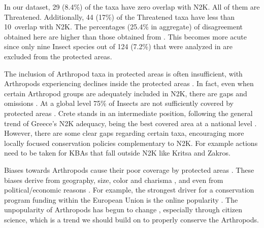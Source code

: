 In our dataset, 29 (8.4\%) of the taxa have zero overlap with N2K. All of them
are Threatened. Additionally, 44 (17\%) of the Threatened taxa have less than
10\ overlap with N2K. The percentages (25.4\% in aggregate) of disagreement
obtained here are higher than those obtained from \textcite{spiliopoulou2021the-natura}.
This becomes more acute since only nine Insect species out of 124 (7.2\%) that
were analyzed in \textcite{spiliopoulou2021the-natura} are excluded from the protected areas.

The inclusion of Arthropod taxa in protected areas is often insufficient, with
Arthropods experiencing declines inside the protected areas \parencite{borges2005ranking,chowdhury2023protected,harry2019protected,rada2019protected}.
In fact, even when certain Arthropod groups are adequately included in N2K,
there are gaps and omissions \parencite{sanchez-fernandez2008are-the-endemic,verovnik2011is-the-natura}.
At a global level 75\% of Insects are not sufficiently covered by protected
areas \parencite{chowdhury2023three-quarters}. Crete stands in an intermediate position,
following the general trend of Greece’s N2K adequacy, being the best covered
area at a national level \parencite{kougioumoutzis2021plant,spiliopoulou2021the-natura}.
However, there are some clear gaps regarding certain taxa, encouraging more
locally focused conservation policies complementary to N2K. For example actions
need to be taken for KBAs that fall outside N2K like Kritsa and Zakros.

Biases towards Arthropods cause their poor coverage by protected
areas \parencite{chowdhury2023protected,damen2013protected,delso2021protected}. These
biases derive from geography, size, color and charisma \parencite{cardoso2012habitats,mammola2020towards,wang2021out-of-sight},
and even from political/economic reasons \parencite{dias-silva2021protected}. For example,
the strongest driver for a conservation program funding within the European
Union is the online popularity \parencite{mammola2020towards}. The unpopularity of
Arthropods has begun to change \parencite{wagner2021insect}, especially through citizen
science, which is a trend we should build on to properly conserve the Arthropods.

